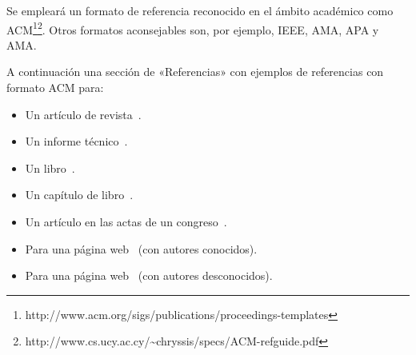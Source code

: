 \documentclass{pre-tfg}
\begin{document}
Se empleará un formato de referencia reconocido en el ámbito académico como
ACM\footnote{http://www.acm.org/sigs/publications/proceedings-templates}\footnote{http://www.cs.ucy.ac.cy/\~{}chryssis/specs/ACM-refguide.pdf}.
Otros formatos aconsejables son, por ejemplo, IEEE, AMA, APA y AMA.

A continuación una sección de «Referencias» con ejemplos de referencias con formato ACM para:

\begin{itemize}
 \item Un artículo de revista~\cite{Bow93}.
\item Un informe técnico~\cite{Ding97}.
\item Un libro~\cite{Tavel07}.
\item Un capítulo de libro~\cite{Greiner99}.
\item Un artículo en las actas de un congreso~\cite{Frohlic00}.
\item Para una página web~\cite{Steele04} (con autores conocidos).
\item Para una página web~\cite{Oxygen} (con autores desconocidos).
\end{itemize}



\end{document}
